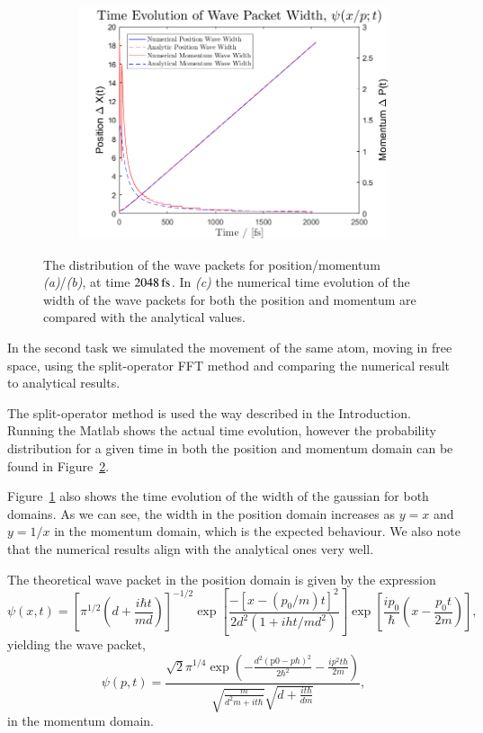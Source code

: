 \begin{figure}[H]
\begin{subfigure}[t]{0.7\textwidth}
\includegraphics[width=\textwidth]{graphics/task2/width_evolution.png}
\caption{}
\label{fig:2_c}
\end{subfigure}

\caption{The distribution of the wave packets for position/momentum \textit{(a)}/\textit{(b)}, at time $\unit[2048]{fs}$. In \textit{(c)} the numerical time evolution of the width of the wave packets for both the position and momentum are compared with the analytical values.}
\label{fig:2}
\end{figure}

In the second task we simulated the movement of the same atom, moving in free space, using the split-operator FFT method and comparing the numerical result to analytical results.

The split-operator method is used the way described in the Introduction. Running the Matlab shows the actual time evolution, however the probability distribution for a given time in both the position and momentum domain can be found in Figure~\ref{fig:2}.

Figure~\ref{fig:2_c} also shows the time evolution of the width of the gaussian for both domains. As we can see, the width in the position domain increases as $y = x$ and $y = 1/x$ in the momentum domain, which is the expected behaviour. We also note that the numerical results align with the analytical ones very well.

The theoretical wave packet in the position domain is given by the expression
\begin{equation}
\psi(x,t) = \left[
\pi^{1/2}\left(
d+\frac{i\hbar t}{md}
\right)
\right]^{-1/2}
\exp\left[
\frac{-\left[x-\left(p_0/m\right)t\right]^2}{2d^2(1+iht/md^2)}
\right]
\exp\left[
\frac{ip_0}{\hbar}\left(x-\frac{p_0t}{2m}\right)
\right],
\end{equation}
yielding the wave packet,
\begin{equation}
\psi(p,t) = \frac{\sqrt{2} \pi^{1/4} \exp \left(-\frac{d^2 (\text{p0}-p \hbar )^2}{2 \hbar ^2}-\frac{i p^2 t \hbar }{2 m}\right)}{\sqrt{\frac{m}{d^2 m+i t \hbar }} \sqrt{d+\frac{i t \hbar }{d m}}},
\end{equation}
in the momentum domain.

